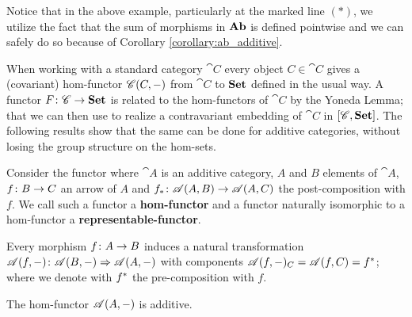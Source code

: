 \begin{remark}
  \label{rem:uniqueness_is_cool}
  Notice that in the above example, particularly at the marked line \((*)\), we utilize the fact that the sum of morphisms in \(\text{\normalfont\textbf{Ab}}\) is defined pointwise and we can safely do so because of Corollary \ref{corollary:ab_additive}.
\end{remark}

When working with a standard category \(\cat{C}\) every object \(C\in\cat{C}\) gives a (covariant) hom-functor \({\mathscr C}(C,-)\) from \(\cat{C}\) to \(\text{\normalfont\textbf{Set}}\) defined in the usual way. A functor \(F\colon {\mathscr C}\to \text{\normalfont\textbf{Set}}\) is related to the hom-functors of \(\cat{C}\) by the Yoneda Lemma; that we can then use to realize a contravariant embedding of \(\cat{C}\) in \([{\mathscr C},\text{\normalfont\textbf{Set}}]\). The following results show that the same can be done for additive categories, without losing the group structure on the hom-sets.

\begin{definition}
  \label{def:representable_functor}
  Consider the functor
  where \(\cat{A}\) is an additive category, \(A\) and \(B\) elements of \(\cat{A}\), \(f\colon B\to C\) an arrow of \(A\) and \({f}_*\colon {\mathscr A}(A,B)\to {\mathscr A}(A,C)\) the post-composition with \(f\). We call such a functor a {\bf hom-functor} and a functor naturally isomorphic to a hom-functor a {\bf representable-functor}.
\end{definition}

\begin{remark}
  \label{rem:representable_natural_transformation}
  Every morphism \(f\colon A\to B\) induces a natural transformation \({\mathscr A}(f,-)\colon {\mathscr A}(B,-)\Rightarrow {\mathscr A}(A,-)\) with components \({\mathscr A}(f,-)_C = {\mathscr A}(f,C) = {f}^*\); where we denote with \({f}^*\) the pre-composition with \(f\).
\end{remark}

\begin{proposition}
  \label{prop:representables_are_additive}
  The hom-functor \({\mathscr A}(A,-)\) is additive.
\end{proposition}

